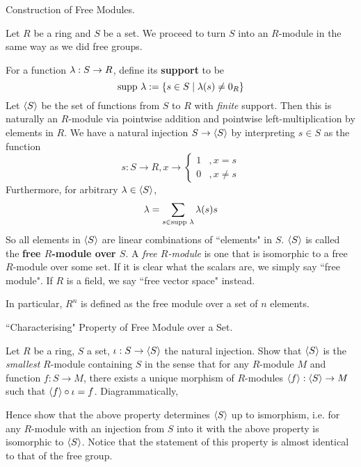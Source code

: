 \documentclass[../book.tex]{subfiles}
\begin{document}
\begin{ex} [Skippable] Construction of Free Modules. 

    Let $R$ be a ring and $S$ be a set. 
    We proceed to turn $S$ into an $R$-module in the same way as we did free groups.
    
    For a function $\lambda : S \to R$, define its \textbf{support} to be \[
        \text{supp } \lambda := \{s \in S \mid \lambda(s) \neq 0_R\}
    \]
    Let $\langle S \rangle$ be the set of functions from $S$ to $R$ with \emph{finite} support.
    Then this is naturally an $R$-module via pointwise addition and
    pointwise left-multiplication by elements in $R$. 
    We have a natural injection $S \to \langle S \rangle$ by
    interpreting $s \in S$ as the function \[
        s : S \to R, x \to \begin{cases}
            1   &, x = s \\
            0   &, x \neq s
        \end{cases}
    \]
    Furthermore, for arbitrary $\lambda \in \langle S \rangle$, \[
        \lambda = \sum_{s \in \text{supp } \lambda} \lambda(s) s
    \]
    So all elements in $\langle S \rangle$ are linear combinations of ``elements" in $S$. 
    $\langle S\rangle$ is called the \textbf{free $R$-module over $S$}.
    A \emph{free $R$-module} is one that is isomorphic 
    to a free $R$-module over some set. 
    If it is clear what the scalars are, we simply say ``free module".
    If $R$ is a field, we say ``free vector space" instead. 
    
    In particular, $R^n$ is defined as the free module over a set of $n$ elements.
\end{ex}

\begin{ex} [Skippable] ``Characterising" Property of Free Module over a Set. 

    Let $R$ be a ring, $S$ a set, $\iota : S \to \langle S\rangle$ the natural injection.
    Show that $\langle S\rangle$ is the \emph{smallest} $R$-module containing $S$
    in the sense that for any $R$-module $M$ and function $f : S \to M$, 
    there exists a unique morphism of $R$-modules
    $\langle f\rangle : \langle S\rangle \to M$ such that $\langle f\rangle \circ \iota = f$. 
    Diagrammatically, 
    \begin{figure} [ht]
        \centering
    \end{figure}
    
    Hence show that the above property determines $\langle S\rangle$ up to ismorphism, i.e.
    for any $R$-module with an injection from $S$ into it with the above property
    is isomorphic to $\langle S\rangle$. 
    Notice that the statement of this property is almost
    identical to that of the free group.
\end{ex}
\end{document}

